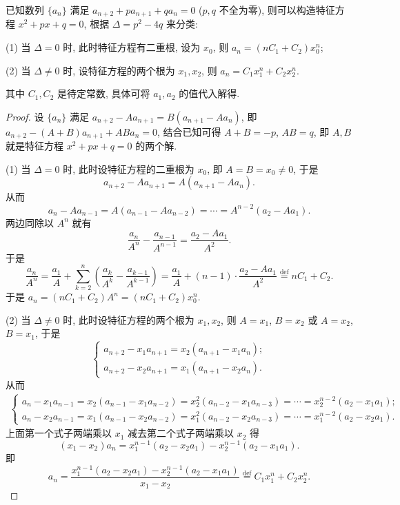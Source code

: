\documentclass[../../main.tex]{subfiles}%
\begin{document}
\begin{proposition}\label{proposition:可直接求通项--类型二}
已知数列 $\{a_n\}$ 满足 $a_{n + 2} + p a_{n + 1} + q a_n = 0$ ($p, q$ 不全为零), 则可以构造特征方程 $x^2 + p x + q = 0$, 根据 $\Delta = p^2 - 4 q$ 来分类:

(1) 当 $\Delta = 0$ 时, 此时特征方程有二重根, 设为 $x_0$, 则 $a_n = (n C_1 + C_2) x_0^n$;

(2) 当 $\Delta \neq 0$ 时, 设特征方程的两个根为 $x_1, x_2$, 则 $a_n = C_1 x_1^n + C_2 x_2^n$.

其中 $C_1, C_2$ 是待定常数, 具体可将 $a_1, a_2$ 的值代入解得.
\end{proposition}
\begin{proof}

设 $\{a_n\}$ 满足 $a_{n + 2} - A a_{n + 1} = B(a_{n + 1} - A a_n)$, 即 $a_{n + 2} - (A + B) a_{n + 1} + A B a_n = 0$, 结合已知可得 $A + B = -p$, $A B = q$, 即 $A, B$ 就是特征方程 $x^2 + p x + q = 0$ 的两个解.

(1) 当 $\Delta = 0$ 时, 此时设特征方程的二重根为 $x_0$, 即 $A = B = x_0 \neq 0$, 于是
\[
a_{n + 2} - A a_{n + 1} = A(a_{n + 1} - A a_n).
\]
从而
\[
a_n - A a_{n - 1} = A(a_{n - 1} - A a_{n - 2}) = \cdots = A^{n - 2}(a_2 - A a_1).
\]
两边同除以 $A^n$ 就有
\[
\frac{a_n}{A^n} - \frac{a_{n - 1}}{A^{n - 1}} = \frac{a_2 - A a_1}{A^2}.
\]
于是
\[
\frac{a_n}{A^n} = \frac{a_1}{A} + \sum_{k = 2}^n \left( \frac{a_k}{A^k} - \frac{a_{k - 1}}{A^{k - 1}} \right) = \frac{a_1}{A} + (n - 1) \cdot \frac{a_2 - A a_1}{A^2} \stackrel{\text{def}}{=} n C_1 + C_2.
\]
于是 $a_n = (n C_1 + C_2) A^n = (n C_1 + C_2) x_0^n$.

(2) 当 $\Delta \neq 0$ 时, 此时设特征方程的两个根为 $x_1, x_2$, 则 $A = x_1$, $B = x_2$ 或 $A = x_2$, $B = x_1$, 于是
\[
\begin{cases} 
a_{n + 2} - x_1 a_{n + 1} = x_2(a_{n + 1} - x_1 a_n); \\
a_{n + 2} - x_2 a_{n + 1} = x_1(a_{n + 1} - x_2 a_n).
\end{cases}
\]
从而
\begin{align*}
\begin{cases}
a_n - x_1 a_{n - 1} = x_2(a_{n - 1} - x_1 a_{n - 2}) = x_2^2(a_{n - 2} - x_1 a_{n - 3}) = \cdots = x_2^{n - 2}(a_2 - x_1 a_1);\\
a_n - x_2 a_{n - 1} = x_1(a_{n - 1} - x_2 a_{n - 2}) = x_1^2(a_{n - 2} - x_2 a_{n - 3}) = \cdots = x_1^{n - 2}(a_2 - x_2 a_1).
\end{cases}
\end{align*}
上面第一个式子两端乘以 $x_1$ 减去第二个式子两端乘以 $x_2$ 得
\[
(x_1 - x_2) a_n = x_1^{n - 1}(a_2 - x_2 a_1) - x_2^{n - 1}(a_2 - x_1 a_1).
\]
即
\[
a_n = \frac{x_1^{n - 1}(a_2 - x_2 a_1) - x_2^{n - 1}(a_2 - x_1 a_1)}{x_1 - x_2} \stackrel{\text{def}}{=} C_1 x_1^n + C_2 x_2^n.
\]

\end{proof}
\end{document}
